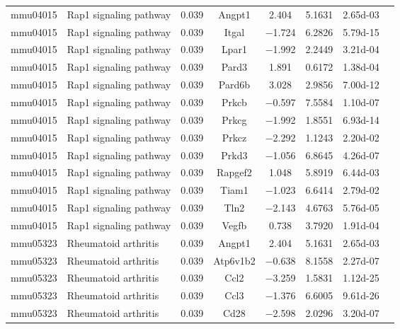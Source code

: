 {\begin{longtable}[l]{cp{4.3cm}cccccc}
mmu04015	& Rap1 signaling pathway	& \num{0.039}	& Angpt1	& \num{ 2.404}	& \num{ 5.1631}	& \num{2.65d-03}\\ 
mmu04015	& Rap1 signaling pathway	& \num{0.039}	& Itgal	& \num{-1.724}	& \num{ 6.2826}	& \num{5.79d-15}\\ 
mmu04015	& Rap1 signaling pathway	& \num{0.039}	& Lpar1	& \num{-1.992}	& \num{ 2.2449}	& \num{3.21d-04}\\ 
mmu04015	& Rap1 signaling pathway	& \num{0.039}	& Pard3	& \num{ 1.891}	& \num{ 0.6172}	& \num{1.38d-04}\\ 
mmu04015	& Rap1 signaling pathway	& \num{0.039}	& Pard6b	& \num{ 3.028}	& \num{ 2.9856}	& \num{7.00d-12}\\ 
mmu04015	& Rap1 signaling pathway	& \num{0.039}	& Prkcb	& \num{-0.597}	& \num{ 7.5584}	& \num{1.10d-07}\\ 
mmu04015	& Rap1 signaling pathway	& \num{0.039}	& Prkcg	& \num{-1.992}	& \num{ 1.8551}	& \num{6.93d-14}\\ 
mmu04015	& Rap1 signaling pathway	& \num{0.039}	& Prkcz	& \num{-2.292}	& \num{ 1.1243}	& \num{2.20d-02}\\ 
mmu04015	& Rap1 signaling pathway	& \num{0.039}	& Prkd3	& \num{-1.056}	& \num{ 6.8645}	& \num{4.26d-07}\\ 
mmu04015	& Rap1 signaling pathway	& \num{0.039}	& Rapgef2	& \num{ 1.048}	& \num{ 5.8919}	& \num{6.44d-03}\\ 
mmu04015	& Rap1 signaling pathway	& \num{0.039}	& Tiam1	& \num{-1.023}	& \num{ 6.6414}	& \num{2.79d-02}\\ 
mmu04015	& Rap1 signaling pathway	& \num{0.039}	& Tln2	& \num{-2.143}	& \num{ 4.6763}	& \num{5.76d-05}\\ 
mmu04015	& Rap1 signaling pathway	& \num{0.039}	& Vegfb	& \num{ 0.738}	& \num{ 3.7920}	& \num{1.91d-04}\\ 
mmu05323	& Rheumatoid arthritis	& \num{0.039}	& Angpt1	& \num{ 2.404}	& \num{ 5.1631}	& \num{2.65d-03}\\ 
mmu05323	& Rheumatoid arthritis	& \num{0.039}	& Atp6v1b2	& \num{-0.638}	& \num{ 8.1558}	& \num{2.27d-07}\\ 
mmu05323	& Rheumatoid arthritis	& \num{0.039}	& Ccl2	& \num{-3.259}	& \num{ 1.5831}	& \num{1.12d-25}\\ 
mmu05323	& Rheumatoid arthritis	& \num{0.039}	& Ccl3	& \num{-1.376}	& \num{ 6.6005}	& \num{9.61d-26}\\ 
mmu05323	& Rheumatoid arthritis	& \num{0.039}	& Cd28	& \num{-2.598}	& \num{ 2.0296}	& \num{3.20d-07}\\ 

\end{longtable}}
